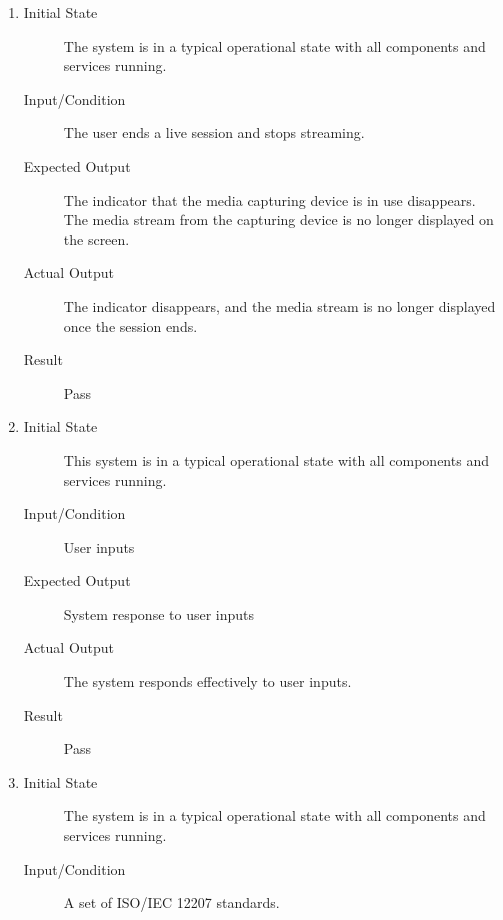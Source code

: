 \documentclass[12pt, titlepage]{article}
\begin{document}
\begin{enumerate}[NFR-T1]
  \item \label{NFRT26}
    \begin{description}
    \item[Initial State] The system is in a typical operational state with all
      components and services running.
    \item[Input/Condition] The user ends a live session and stops streaming.
    \item[Expected Output] The indicator that the media capturing device is in use
      disappears. The media stream from the capturing device is no longer
      displayed on the screen.
    \item[Actual Output] The indicator disappears, and the media stream is no
      longer displayed once the session ends.
    \item[Result] Pass
    \end{description}
  \item \label{NFRT27}
    \begin{description}
    \item[Initial State] This system is in a typical operational state with all
      components and services running.
    \item[Input/Condition] User inputs
    \item[Expected Output] System response to user inputs
    \item[Actual Output] The system responds effectively to user inputs.
    \item[Result] Pass
    \end{description}
  \item \label{NFRT28}
    \begin{description}
    \item[Initial State] The system is in a typical operational state with all
      components and services running.
    \item[Input/Condition] A set of ISO/IEC 12207 standards.

\end{description}
\end{enumerate}
\end{document}
